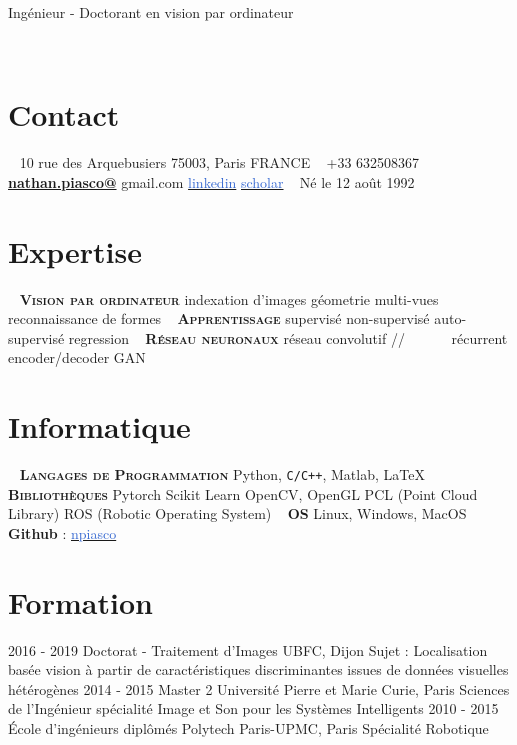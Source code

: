 \documentclass[]{friggeri-cv-cust}
\begin{document}
      {Ingénieur - Doctorant en vision par ordinateur}
      
\vspace{10pt}
\vspace{1pt}

\begin{aside}
  ~
  \section{Contact}
    ~
    10 rue des Arquebusiers
    75003, Paris
    FRANCE
    ~
    +33 632508367
    ~
   	\href{mailto:nathan.piasco@gmail.com}{\textbf{nathan.piasco@}}
   	gmail.com
	{\href{https://www.linkedin.com/in/nathan-piasco-a4766aa5/}{\textcolor{highlight}{linkedin}}}
	{\href{https://scholar.google.fr/citations?user=S3zYmOYAAAAJ&hl=fr}{\textcolor{highlight}{scholar}}}
	~
    Né le 12 août 1992
    ~    
  \section{Expertise}
    ~
    \textbf{\small{\textsc{Vision par ordinateur}}}
    indexation d'images
    géometrie multi-vues
    reconnaissance de formes
    ~    
    \textbf{\small{\textsc{Apprentissage}}}
    supervisé
    non-supervisé
    auto-supervisé
    regression
    ~    
    \textbf{\small{\textsc{Réseau neuronaux}}}
    réseau convolutif
    //~~~~~~ récurrent
    encoder/decoder
    GAN
    ~    
  \section{Informatique}
    ~  
    \textbf{\textsc{\textsc{Langages de Programmation}}}
    Python, \texttt{C/C++},
    Matlab,  \LaTeX
    ~
    \textbf{\textsc{Bibliothèques}}
    Pytorch
    Scikit Learn
	OpenCV, OpenGL
    PCL (Point Cloud Library)
    ROS (Robotic Operating System)
    ~
    \textbf{\textsc{OS}}
    Linux, Windows, MacOS
    ~
    \textbf{{Github}} : {\href{https://github.com/npiasco}{\textcolor{highlight}{npiasco}}}
\end{aside}

\section{Formation}
\begin{entrylist}
  \entry
    {2016 - 2019}
    {Doctorat - Traitement d'Images}
    {UBFC, Dijon}
    {Sujet : Localisation basée vision à partir de caractéristiques discriminantes issues de données visuelles hétérogènes}
  \entry
    {2014 - 2015}
    {Master 2}
    {Universit\'e Pierre et Marie Curie, Paris}
    {Sciences de l'Ingénieur spécialité Image et Son pour les Systèmes Intelligents}
  \entry
    {2010 - 2015}
    {École d’ingénieurs diplômés}
    {Polytech Paris-UPMC, Paris}
    {Spécialité Robotique}
\end{entrylist}
\end{document}
